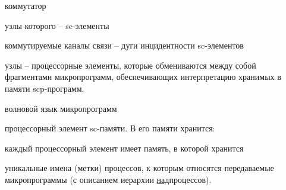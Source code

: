 \begin{textitemize}
	\item коммутатор
	\begin{textitemize}
		\item узлы которого -- sc-элементы
		\item коммутируемые каналы связи -- дуги инцидентности sc-элементов
		\item узлы -- процессорные элементы, которые обмениваются между собой фрагментами микропрограмм, обеспечивающих интерпретацию хранимых в памяти scp-программ.
		\item волновой язык микропрограмм
	\end{textitemize}
	\item процессорный элемент sc-памяти. В его памяти хранится:
\end{textitemize}

	\item каждый процессорный элемент имеет память, в которой хранится
		\begin{textitemize}
		\item уникальные имена (метки) процессов, к которым относятся передаваемые микропрограммы (с описанием иерархии \underline{над}процессов).
	\end{textitemize}